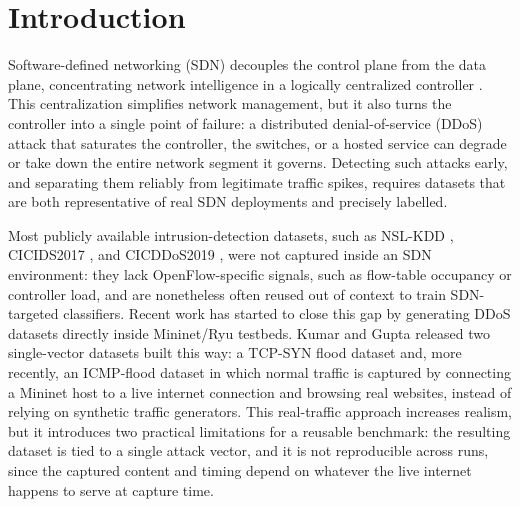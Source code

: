 \documentclass[journal,article,submit,moreauthors]{Definitions/mdpi}
\begin{document}
\section{Introduction}\label{sec:intro}

Software-defined networking (SDN) decouples the control plane from the data plane, concentrating network intelligence in a logically centralized controller \citep{kreutz2015sdn}. This centralization simplifies network management, but it also turns the controller into a single point of failure: a distributed denial-of-service (DDoS) attack that saturates the controller, the switches, or a hosted service can degrade or take down the entire network segment it governs. Detecting such attacks early, and separating them reliably from legitimate traffic spikes, requires datasets that are both representative of real SDN deployments and precisely labelled.

Most publicly available intrusion-detection datasets, such as NSL-KDD \citep{tavallaee2009nslkdd}, CICIDS2017 \citep{sharafaldin2018cicflowmeter}, and CICDDoS2019 \citep{sharafaldin2019cicddos2019}, were not captured inside an SDN environment: they lack OpenFlow-specific signals, such as flow-table occupancy or controller load, and are nonetheless often reused out of context to train SDN-targeted classifiers. Recent work has started to close this gap by generating DDoS datasets directly inside Mininet/Ryu testbeds. Kumar and Gupta released two single-vector datasets built this way: a TCP-SYN flood dataset \citep{kumar2025synflood} and, more recently, an ICMP-flood dataset \citep{kumar2026icmpfloodsdn} in which normal traffic is captured by connecting a Mininet host to a live internet connection and browsing real websites, instead of relying on synthetic traffic generators. This real-traffic approach increases realism, but it introduces two practical limitations for a reusable benchmark: the resulting dataset is tied to a single attack vector, and it is not reproducible across runs, since the captured content and timing depend on whatever the live internet happens to serve at capture time.
\end{document}
